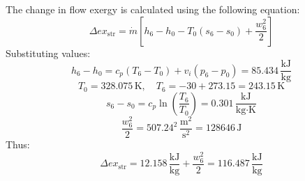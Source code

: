 The change in flow exergy is calculated using the following equation:  
\[
\Delta ex_{\text{str}} = \dot{m} \left[ h_6 - h_0 - T_0 (s_6 - s_0) + \frac{w_6^2}{2} \right]
\]  
Substituting values:  
\[
h_6 - h_0 = c_p (T_6 - T_0) + v_i (p_6 - p_0) = 85.434 \, \frac{\text{kJ}}{\text{kg}}
\]  
\[
T_0 = 328.075 \, \text{K}, \quad T_6 = -30 + 273.15 = 243.15 \, \text{K}
\]  
\[
s_6 - s_0 = c_p \ln \left( \frac{T_6}{T_0} \right) = 0.301 \, \frac{\text{kJ}}{\text{kg·K}}
\]  
\[
\frac{w_6^2}{2} = 507.24^2 \, \frac{\text{m}^2}{\text{s}^2} = 128646 \, \text{J}
\]  
Thus:  
\[
\Delta ex_{\text{str}} = 12.158 \, \frac{\text{kJ}}{\text{kg}} + \frac{w_6^2}{2} = 116.487 \, \frac{\text{kJ}}{\text{kg}}
\]